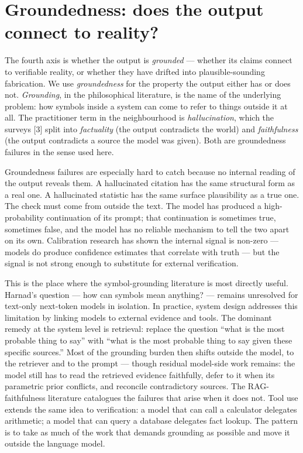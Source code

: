 \documentclass[11pt,a4paper]{article}
\begin{document}
\section*{Groundedness: does the output connect to reality?}

The fourth axis is whether the output is \emph{grounded} ---
whether its claims connect to verifiable reality, or whether they
have drifted into plausible-sounding fabrication. We use
\emph{groundedness} for the property the output either has or does
not. \emph{Grounding}, in the philosophical literature, is the
name of the underlying problem: how symbols inside a system can
come to refer to things outside it at all. The practitioner term in the
neighbourhood is \emph{hallucination}, which the surveys [3] split
into \emph{factuality} (the output contradicts the world) and
\emph{faithfulness} (the output contradicts a source the model was
given). Both are groundedness failures in the sense used here.

Groundedness failures are especially hard to catch because no
internal reading of the output reveals them. A hallucinated
citation has the same structural form as a real one. A
hallucinated statistic has the same surface plausibility as a true
one. The check must come from outside the text. The model has
produced a high-probability continuation of its prompt; that
continuation is sometimes true, sometimes false, and the model has
no reliable mechanism to tell the two apart on its own.
Calibration research has shown the internal signal is non-zero ---
models do produce confidence estimates that correlate with truth
--- but the signal is not strong enough to substitute for external
verification.

This is the place where the symbol-grounding literature is most
directly useful. Harnad's question --- how can symbols mean
anything? --- remains unresolved for text-only next-token models in
isolation. In practice, system design addresses this limitation by
linking models to external evidence and tools. The dominant remedy
at the system level is retrieval: replace the question ``what is
the most probable thing to say'' with ``what is the most probable
thing to say given these specific sources.'' Most of the
grounding burden then shifts outside the model, to the retriever
and to the prompt --- though residual model-side work remains:
the model still has to read the retrieved evidence faithfully,
defer to it when its parametric prior conflicts, and reconcile
contradictory sources. The RAG-faithfulness literature catalogues
the failures that arise when it does not. Tool use extends the
same idea to verification: a model that can call a calculator
delegates arithmetic; a model that can query a database delegates
fact lookup. The pattern is to take as much of the work that
demands grounding as possible and move it outside the language
model.
\end{document}
